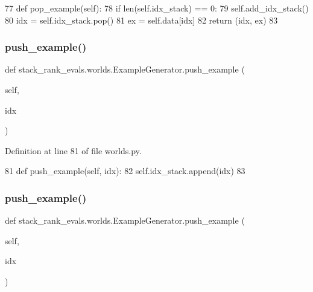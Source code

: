 \begin{DoxyCode}
77     \textcolor{keyword}{def }pop\_example(self):
78         \textcolor{keywordflow}{if} len(self.idx\_stack) == 0:
79             self.add\_idx\_stack()
80         idx = self.idx\_stack.pop()
81         ex = self.data[idx]
82         \textcolor{keywordflow}{return} (idx, ex)
83 
\end{DoxyCode}
\mbox{\label{classstack__rank__evals_1_1worlds_1_1ExampleGenerator_a75b62011b063cb2879cca50917383d0e}} 
\subsubsection{\texorpdfstring{push\+\_\+example()}{push\_example()}\hspace{0.1cm}{\footnotesize\ttfamily [1/2]}}
{\footnotesize\ttfamily def stack\+\_\+rank\+\_\+evals.\+worlds.\+Example\+Generator.\+push\+\_\+example (\begin{DoxyParamCaption}\item[{}]{self,  }\item[{}]{idx }\end{DoxyParamCaption})}



Definition at line 81 of file worlds.\+py.


\begin{DoxyCode}
81     \textcolor{keyword}{def }push\_example(self, idx):
82         self.idx\_stack.append(idx)
83 
\end{DoxyCode}
\mbox{\label{classstack__rank__evals_1_1worlds_1_1ExampleGenerator_a75b62011b063cb2879cca50917383d0e}} 
\subsubsection{\texorpdfstring{push\+\_\+example()}{push\_example()}\hspace{0.1cm}{\footnotesize\ttfamily [2/2]}}
{\footnotesize\ttfamily def stack\+\_\+rank\+\_\+evals.\+worlds.\+Example\+Generator.\+push\+\_\+example (\begin{DoxyParamCaption}\item[{}]{self,  }\item[{}]{idx }\end{DoxyParamCaption})}




